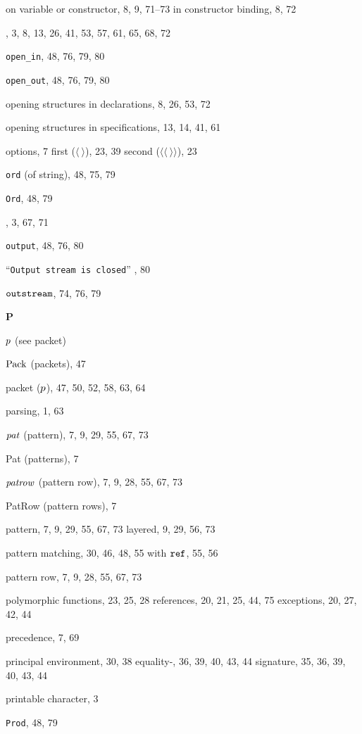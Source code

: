 \begin{theindex}
\subitem on variable or constructor, 8, 9, 71--73
\subitem in constructor binding, 8, 72
\item \OPEN, 3, 8, 13, 26, 41, 53, 57, 61, 65, 68, 72
\item \verb+open_in+, 48, 76, 79, 80
\item \verb+open_out+, 48, 76, 79, 80
\item opening structures in declarations, 8, 26, 53, 72
\item opening structures in specifications, 13, 14, 41, 61
\item options, 7
\subitem first ($\langle\ \rangle$), 23, 39
\subitem second ($\langle\langle\ \rangle\rangle$), 23
\item {\tt ord} (of string), 48, 75, 79
\item {\tt Ord}, 48, 79
\item \ORELSE, 3, 67, 71
\item {\tt output}, 48, 76, 80
\item ``{\tt Output stream is closed}'' , 80
\item $\mbox{\tt outstream}$, 74, 76, 79
\indexspace
\parbox{65mm}{\hfil{\large\bf P}\hfil}
\indexspace
\item $p$ (see packet) 
\item ${\rm Pack}$ (packets), 47
\item packet ($p$), 47, 50, 52, 58, 63, 64
\item parsing, 1, 63
\item ${\it pat}$ (pattern), 7, 9, 29, 55, 67, 73
\item Pat (patterns), 7
\item ${\it patrow}$ (pattern row), 7, 9, 28, 55, 67, 73
\item PatRow (pattern rows), 7
\item pattern, 7, 9, 29, 55, 67, 73
\subitem layered, 9, 29, 56, 73
\item pattern matching, 30, 46, 48, 55
\subitem with $\mbox{\tt ref}$, 55, 56
\item pattern row, 7, 9, 28, 55, 67, 73
\item polymorphic 
\subitem functions, 23, 25, 28
\subitem references, 20, 21, 25, 44, 75
\subitem exceptions, 20, 27, 42, 44
\item precedence, 7, 69
\item principal 
\subitem environment, 30, 38
\subitem equality-, 36, 39, 40, 43, 44
\subitem signature, 35, 36, 39, 40, 43, 44
\item printable character, 3
\item {\tt Prod}, 48, 79

\end{theindex}
